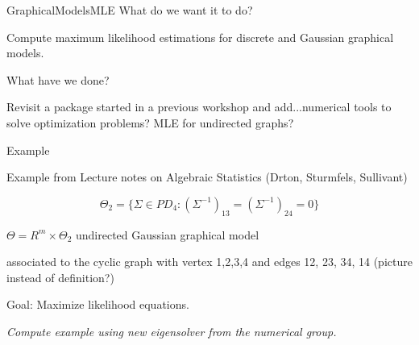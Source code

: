 \documentclass[10pt]{beamer}
\begin{document}
\begin{frame}{GraphicalModelsMLE}
What do we want it to do?

Compute maximum likelihood estimations for discrete and Gaussian graphical models. 

What have we done?

Revisit a package started in a previous workshop and add...numerical tools to solve optimization problems? MLE for undirected graphs?

\end{frame}

\begin{frame}{Example}

Example from Lecture notes on Algebraic Statistics (Drton, Sturmfels, Sullivant)

$$\Theta_2=\lbrace\Sigma\in PD_4: (\Sigma^{-1})_{13}=(\Sigma^{-1})_{24}=0\rbrace$$

$\Theta=R^m\times\Theta_2$ undirected Gaussian graphical model


associated to the cyclic graph with vertex 1,2,3,4 and edges 12, 23, 34, 14 (picture instead of definition?)

Goal: Maximize likelihood equations.

\emph{Compute example using new eigensolver from the numerical group.} 
\end{frame}
\end{document}
